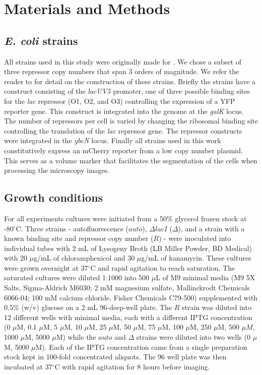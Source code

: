 \section{Materials and Methods}

\subsection{\textit{E. coli} strains}

All strains used in this study were originally made for \cite{Razo-Mejia2018}.
We chose a subset of three repressor copy numbers that span 3 orders of
magnitude. We refer the reader to \cite{Razo-Mejia2018} for detail on the
construction of these strains. Briefly the strains have a construct consisting
of the \textit{lacUV5} promoter, one of three possible binding sites for the
\textit{lac} repressor (O1, O2, and O3) controlling the expression of a YFP
reporter gene. This construct is integrated into the genome at the
\textit{galK} locus. The number of repressors per cell is varied by changing
the ribosomal binding site controlling the translation of the \textit{lac}
repressor gene. The repressor constructs were integrated in the \textit{ybcN}
locus. Finally all strains used in this work constitutively express an mCherry
reporter from a low copy number plasmid. This serves as a volume marker that
facilitates the segmentation of the cells when processing the microscopy
images.

\subsection{Growth conditions}

For all experiments cultures were initiated from a 50\% glycerol frozen stock
at -80$^\circ$C. Three strains - autofluorescence ($auto$), $\Delta lacI$
($\Delta$), and a strain with a known binding site and repressor copy number
($R$) - were inoculated into individual tubes with 2 mL of Lysogeny Broth (LB
Miller Powder, BD Medical) with 20 $\mu$g/mL of chloramphenicol and 30
$\mu$g/mL of kanamycin. These cultures were grown overnight at 37$^\circ$C and
rapid agitation to reach saturation. The saturated cultures were diluted 1:1000
into 500 $\mu$L of M9 minimal media (M9 5X Salts, Sigma-Aldrich M6030; 2 mM
magnesium sulfate, Mallinckrodt Chemicals 6066-04; 100 mM calcium chloride,
Fisher Chemicals C79-500) supplemented with 0.5\% (w/v) glucose on a 2 mL
96-deep-well plate. The $R$ strain was diluted into 12 different wells with
minimal media, each with a different IPTG  concentration (0 $\mu$M, 0.1 $\mu$M,
5 $\mu$M, 10 $\mu$M, 25 $\mu$M, 50 $\mu$M, 75 $\mu$M, 100 $\mu$M, 250 $\mu$M,
500 $\mu M$, 1000 $\mu$M, 5000 $\mu$M) while  the $auto$ and $\Delta$ strains
were diluted into two wells (0 $\mu$M, 5000 $\mu$M). Each of the IPTG
concentration came from a single preparation stock kept in 100-fold
concentrated aliquots. The 96 well plate was then incubated at 37$^\circ$C with
rapid agitation for 8 hours before imaging.

